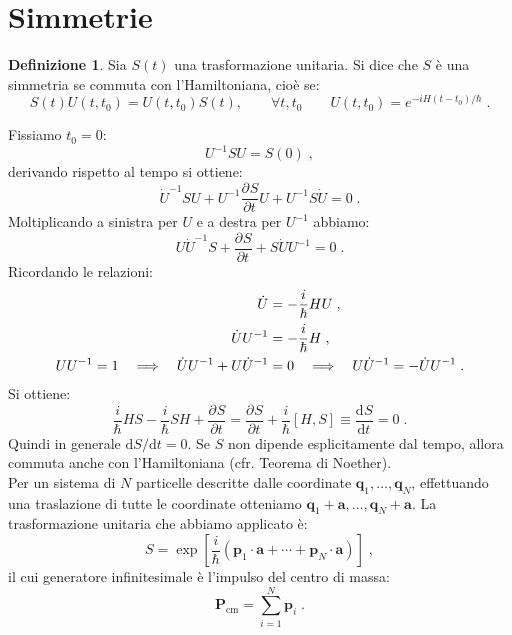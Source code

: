 \documentclass[10pt,a4paper]{report}
\theoremstyle{definition}
\newtheorem{dfn}{Definizione}[section]
\newcommand{\pdev}[3][]{\frac{\partial^{#1} #2}{\partial #3^{#1}}}
\newcommand{\dev}[3][]{\frac{\mathrm{d}^{#1} #2}{\mathrm{d} #3^{#1}}}
\numberwithin{equation}{section}
\newcommand{\diff}[1][]{\mathrm{d}#1}
\begin{document}
\section{Simmetrie}
\begin{dfn} Sia $S(t)$ una trasformazione unitaria. Si dice che $S$ è una simmetria se commuta con l'Hamiltoniana, cioè se:
\begin{equation}
S(t)U(t,t_0)=U(t,t_0)S(t), \qquad \forall t,t_0 \qquad U(t,t_0)=e^{-iH(t-t_0)/\hbar}\;.
\end{equation}
\end{dfn}
Fissiamo $t_0=0$:
\begin{equation}
U^{-1}SU=S(0)\;,
\end{equation}
derivando rispetto al tempo si ottiene:
\begin{equation}
\dot{U}^{-1}SU+U^{-1}\pdev{S}{t}U+U^{-1}S\dot{U}=0\;.
\end{equation}
Moltiplicando a sinistra per $U$ e a destra per $U^{-1}$ abbiamo:
\begin{equation}
U\dot{U}^{-1}S+\pdev{S}{t}+S\dot{U}U^{-1}=0\;.
\end{equation}
Ricordando le relazioni:
\begin{align}
\dot{U}&= -\frac{i}{\hbar}HU \notag\;, \\
\dot{U}U^{-1}&= -\frac{i}{\hbar}H \notag\;, \\
UU^{-1} = 1 \quad \Longrightarrow \quad \dot{U}U^{-1}+U\dot{U}^{-1}&=0\quad \Longrightarrow\quad U\dot{U}^{-1}=-\dot{U}U^{-1}\;.
\end{align}
Si ottiene:
\begin{equation}
\frac{i}{\hbar}HS-\frac{i}{\hbar}SH+\pdev{S}{t}=\pdev{S}{t}+\frac{i}{\hbar}[H,S]\equiv\dev{S}{t}=0\;.
\end{equation}
Quindi in generale $\diff{S}/\diff{t}=0$. Se $S$ non dipende esplicitamente dal tempo, allora commuta anche con l'Hamiltoniana (cfr. Teorema di Noether). \\
Per un sistema di $N$ particelle descritte dalle coordinate $\mathbf{q}_1,\ldots,\mathbf{q}_N$, effettuando una traslazione di tutte le coordinate otteniamo $\mathbf{q}_1+\mathbf{a},\ldots,\mathbf{q}_N+\mathbf{a}$. La trasformazione unitaria che abbiamo applicato è:
\begin{equation}
S=\exp\left[\frac{i}{\hbar}\left(\mathbf{p}_1\cdot\mathbf{a}+\cdots+\mathbf{p}_N\cdot\mathbf{a}\right)\right]\;,
\end{equation}
il cui generatore infinitesimale è l'impulso del centro di massa:
\begin{equation}
\mathbf{P}_{\mathrm{cm}}=\sum_{i=1}^N \mathbf{p}_i\;.
\end{equation}
\end{document}
